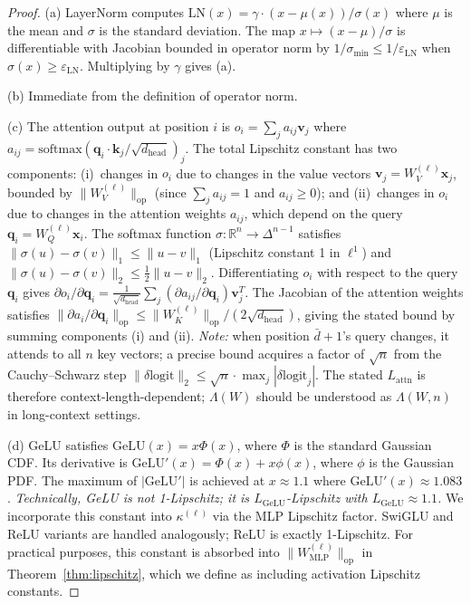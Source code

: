 \documentclass[11pt]{article}
\begin{document}
\begin{proof}
(a) LayerNorm computes
$\mathrm{LN}(x) = \gamma \cdot (x - \mu(x))/\sigma(x)$ where $\mu$ is the
mean and $\sigma$ is the standard deviation.  The map $x \mapsto (x-\mu)/\sigma$
is differentiable with Jacobian bounded in operator norm by $1/\sigma_{\min}
\leq 1/\varepsilon_{\mathrm{LN}}$ when $\sigma(x) \geq \varepsilon_{\mathrm{LN}}$.
Multiplying by $\gamma$ gives (a).

(b) Immediate from the definition of operator norm.

(c) The attention output at position $i$ is
$o_i = \sum_j a_{ij} \mathbf{v}_j$ where
$a_{ij} = \mathrm{softmax}(\mathbf{q}_i \cdot \mathbf{k}_j / \sqrt{d_{\mathrm{head}}})_j$.
The total Lipschitz constant has two components: (i)~changes in $o_i$ due to
changes in the value vectors $\mathbf{v}_j = W_V^{(\ell)}\mathbf{x}_j$, bounded
by $\|W_V^{(\ell)}\|_{\mathrm{op}}$ (since $\sum_j a_{ij} = 1$ and $a_{ij} \geq 0$);
and (ii)~changes in $o_i$ due to changes in the attention weights $a_{ij}$,
which depend on the query $\mathbf{q}_i = W_Q^{(\ell)}\mathbf{x}_i$.
The softmax function $\sigma: \mathbb{R}^n \to \Delta^{n-1}$ satisfies
$\|\sigma(u) - \sigma(v)\|_1 \leq \|u - v\|_1$ (Lipschitz constant 1 in $\ell^1$)
and $\|\sigma(u) - \sigma(v)\|_2 \leq \tfrac{1}{2}\|u-v\|_2$.  Differentiating
$o_i$ with respect to the query $\mathbf{q}_i$ gives $\partial o_i / \partial
\mathbf{q}_i = \frac{1}{\sqrt{d_{\mathrm{head}}}} \sum_j (\partial a_{ij}/\partial \mathbf{q}_i)
\mathbf{v}_j^T$.  The Jacobian of the attention weights satisfies
$\|\partial a_i/\partial \mathbf{q}_i\|_{\mathrm{op}} \leq
\|W_K^{(\ell)}\|_{\mathrm{op}} / (2\sqrt{d_{\mathrm{head}}})$, giving the stated bound by
summing components (i) and (ii).  \emph{Note:} when position $\bar{d}+1$'s query changes, it attends to all $n$ key vectors; a precise bound acquires a factor of $\sqrt{n}$ from the Cauchy--Schwarz step $\|\delta\mathrm{logit}\|_2 \leq \sqrt{n} \cdot \max_j|\delta\mathrm{logit}_j|$.  The stated $L_{\mathrm{attn}}$ is therefore context-length-dependent; $\Lambda(W)$ should be understood as $\Lambda(W, n)$ in long-context settings.

(d) GeLU satisfies $\mathrm{GeLU}(x) = x\Phi(x)$, where $\Phi$ is the standard
Gaussian CDF.  Its derivative is $\mathrm{GeLU}'(x) = \Phi(x) + x\phi(x)$,
where $\phi$ is the Gaussian PDF.  The maximum of $|\mathrm{GeLU}'|$ is achieved
at $x \approx 1.1$ where $\mathrm{GeLU}'(x) \approx 1.083$.
\emph{Technically, GeLU is not 1-Lipschitz; it is $L_{\mathrm{GeLU}}$-Lipschitz
with $L_{\mathrm{GeLU}} \approx 1.1$.}  We incorporate this constant into
$\kappa^{(\ell)}$ via the MLP Lipschitz factor.  SwiGLU and ReLU variants are
handled analogously; ReLU is exactly 1-Lipschitz.  For practical purposes,
this constant is absorbed into $\|W_{\mathrm{MLP}}^{(\ell)}\|_{\mathrm{op}}$
in Theorem~\ref{thm:lipschitz}, which we define as including activation
Lipschitz constants.
\end{proof}
\end{document}
